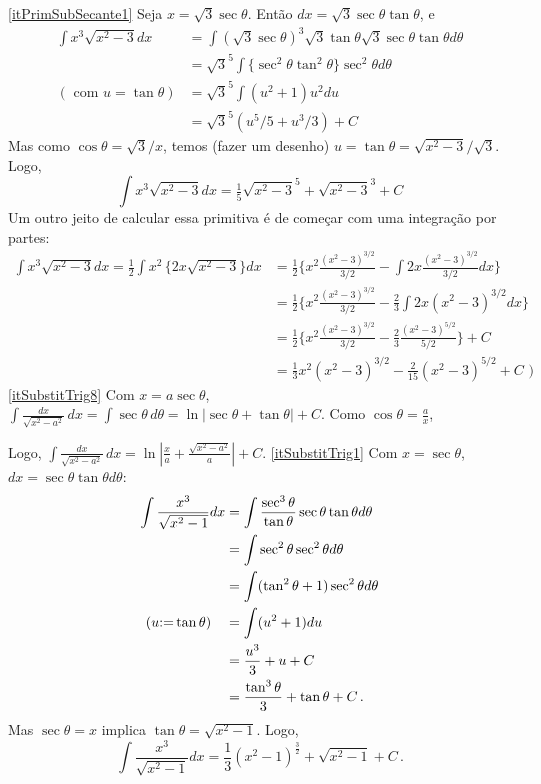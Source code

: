 \begin{Solution}{9.33}
\eqref{itPrimSubSecante1}
Seja $x=\sqrt{3}\sec \theta$. Então $dx=\sqrt{3}\sec \theta\tan \theta$, e
\begin{align*}
 \int x^3\sqrt{x^2-3}dx&=\int (\sqrt{3}\sec \theta)^3 \sqrt{3}  \tan \theta
\sqrt{3}\sec \theta\tan \theta d\theta\\
&=\sqrt{3}^5\int \{\sec^2\theta \tan^2 \theta\}\sec^2 \theta d\theta\\
(\text{ com }u=\tan \theta)&=\sqrt{3}^5\int (u^2+1)u^2du\\
&=\sqrt{3}^5(u^5/5+u^3/3)+C
\end{align*}
Mas como $\cos \theta=\sqrt{3}/x$, temos (fazer um desenho) $u=\tan
\theta=\sqrt{x^2-3}/\sqrt{3}$. Logo,
$$
\int x^3\sqrt{x^2-3}dx=\tfrac15\sqrt{x^2-3}^5+\sqrt{x^2-3}^3+C
$$
Um outro jeito de calcular essa primitiva é de começar com uma integração por
partes:
\begin{align*}
\int x^3\sqrt{x^2-3}dx=
 \tfrac12\int x^2\,
\big\{2x\sqrt{x^2-3}\big\}dx&=\tfrac12\Big\{x^2\frac{(x^2-3)^{3/2}}{3/2}-\int
2x\frac{(x^2-3)^{3/2}}{3/2}dx\Big\}\\
&=\tfrac12\Big\{x^2\frac{(x^2-3)^{3/2}}{3/2}-\tfrac23\int
2x{(x^2-3)^{3/2}}dx\Big\}\\
&=\tfrac12\Big\{x^2\frac{(x^2-3)^{3/2}}{3/2}-\tfrac23\frac{(x^2-3)^{5/2}}{5/2}
\Big\}+C\\
&=\tfrac13x^2{(x^2-3)^{3/2}}-\tfrac{2}{15}{(x^2-3)^{5/2}}+C\,\,)
\end{align*}
\eqref{itSubstitTrig8} Com $x=a\sec\theta$,
$\int
\frac{dx}{\sqrt{x^2-a^2}}\,dx=\int\sec\theta\,
d\theta=\ln|\sec\theta+\tan\theta|+C$. Como $\cos\theta=\frac{a}{x}$,
\begin{center}
\begin{bmlimage}\end{bmlimage}
\end{center}
Logo,
$\int
\frac{dx}{\sqrt{x^2-a^2}}\,dx=\ln|\tfrac{x}{a}+\tfrac{\sqrt{x^2-a^2}}{a}|+C$.
\eqref{itSubstitTrig1}
Com $x=\sec \theta$, $dx=\sec \theta\tan \theta
d\theta$:
\begin{align*}
\int\frac{x^3}{\sqrt{x^2-1}}dx&=\int
\frac{\sec^3\theta}{\tan \theta}\sec \theta\tan \theta d\theta\\
&=\int \sec^2\theta \sec^2\theta d\theta\\
&=\int (\tan^2\theta+1)\sec^2\theta d\theta\\
(u{:=} \tan \theta)\quad&=\int (u^2+1)du\\
&=\frac{u^3}{3}+u+C\\
&=\frac{\tan^3\theta}{3}+\tan\theta+C\,.
\end{align*}
Mas $\sec \theta=x$ implica $\tan\theta=\sqrt{x^2-1}$.
Logo,
$$
\int\frac{x^3}{\sqrt{x^2-1}}dx=
\frac{1}{3}(x^2-1)^{\tfrac32}+\sqrt{x^2-1}+C\,.
$$

\end{Solution}
